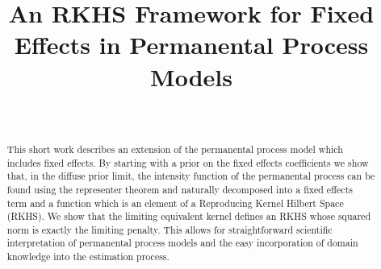 \documentclass[ejsv2,preprint]{imsart}
\begin{document}
\begin{frontmatter}
\title{An RKHS Framework for Fixed Effects in Permanental Process Models}


\begin{aug}
\author[A]{~}

\address[A]{Department of Applied Mathematics,
University of Colorado Boulder}
\end{aug}

\begin{abstract}
This short work describes an extension of the permanental process model which includes fixed effects. By starting with a prior on the fixed effects coefficients we show that, in the diffuse prior limit, the intensity function of the permanental process can be found using the representer theorem and naturally decomposed into a fixed effects term and a function which is an element of a Reproducing Kernel Hilbert Space (RKHS). We show that the limiting equivalent kernel defines an RKHS whose squared norm is exactly the limiting penalty. This allows for straightforward scientific interpretation of permanental process models and the easy incorporation of domain knowledge into the estimation process. 
\end{abstract}


\begin{keyword}
\end{keyword}

 
\end{frontmatter}
\end{document}
